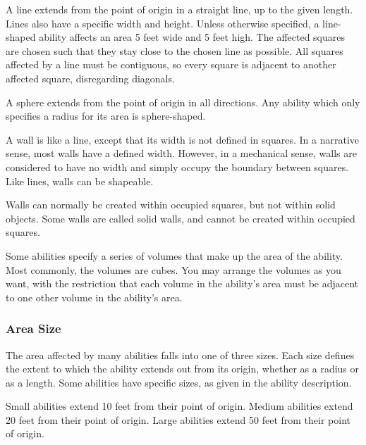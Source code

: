              A line extends from the point of origin in a straight line, up to the given length.
            Lines also have a specific width and height.
            Unless otherwise specified, a line-shaped ability affects an area 5 feet wide and 5 feet high.
            The affected squares are chosen such that they stay close to the chosen line as possible.
            All squares affected by a line must be contiguous, so every square is adjacent to another affected square, disregarding diagonals.

             A sphere extends from the point of origin in all directions.
            Any ability which only specifies a radius for its area is sphere-shaped.

             A wall is like a line, except that its width is not defined in squares.
            In a narrative sense, most walls have a defined width.
            However, in a mechanical sense, walls are considered to have no width and simply occupy the boundary between squares.
            Like lines, walls can be shapeable.

            Walls can normally be created within occupied squares, but not within solid objects.
            Some walls are called solid walls, and cannot be created within occupied squares.

             Some abilities specify a series of volumes that make up the area of the ability.
            Most commonly, the volumes are cubes.
            You may arrange the volumes as you want, with the restriction that each volume in the ability's area must be adjacent to one other volume in the ability's area.

        \subsubsection{Area Size}

            The area affected by many abilities falls into one of three sizes.
            Each size defines the extent to which the ability extends out from its origin, whether as a radius or as a length.
            Some abilities have specific sizes, as given in the ability description.

             Small abilities extend 10 feet from their point of origin.
             Medium abilities extend 20 feet from their point of origin.
             Large abilities extend 50 feet from their point of origin.

